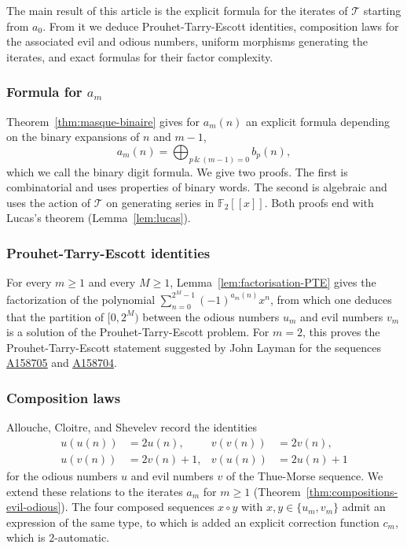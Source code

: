 \documentclass[12pt,reqno]{article}
\newcommand{\seqnum}[1]{\href{https://oeis.org/#1}{\rm \underline{#1}}}
\theoremstyle{plain}
\theoremstyle{definition}
\begin{document}
The main result of this article is the explicit formula for the iterates of
$\mathcal{T}$ starting from $a_0$. From it we deduce Prouhet-Tarry-Escott identities, composition laws for the associated evil and odious numbers, uniform morphisms generating the iterates, and exact formulas for their factor complexity.

\subsubsection*{Formula for $a_m$}

Theorem~\ref{thm:masque-binaire} gives for $a_m(n)$ an explicit formula
depending on the binary expansions of $n$ and $m-1$,
\[
  a_m(n) = \bigoplus_{p\,\&\,(m-1)=0} b_p(n),
\]
which we call the binary digit formula. We give two proofs. The first
is combinatorial and uses properties of binary words. The second is
algebraic and uses the action of $\mathcal{T}$ on generating series
in $\mathbb{F}_2[[x]]$. Both proofs end with Lucas's theorem
(Lemma~\ref{lem:lucas}).

\subsubsection*{Prouhet-Tarry-Escott identities}

For every $m \ge 1$ and every $M \ge 1$,
Lemma~\ref{lem:factorisation-PTE} gives the factorization of the
polynomial $\sum_{n=0}^{2^M-1} (-1)^{a_m(n)} x^n$, from which one
deduces that the partition of $[0, 2^M)$ between the odious numbers
$u_m$ and evil numbers $v_m$ is a solution of the
Prouhet-Tarry-Escott problem. For $m=2$, this proves the Prouhet-Tarry-Escott statement suggested
by John Layman for the sequences \seqnum{A158705} and \seqnum{A158704}.

\subsubsection*{Composition laws}

Allouche, Cloitre, and Shevelev \cite{ACS2016} record the identities
\begin{align*}
  u(u(n)) &= 2u(n), & v(v(n)) &= 2v(n), \\
  u(v(n)) &= 2v(n)+1, & v(u(n)) &= 2u(n)+1
\end{align*}
for the odious numbers $u$ and evil numbers $v$ of the Thue-Morse
sequence. We extend these relations to the iterates $a_m$ for
$m \ge 1$ (Theorem~\ref{thm:compositions-evil-odious}). The four
composed sequences $x \circ y$ with $x, y \in \{u_m, v_m\}$ admit
an expression of the same type, to which is added an explicit
correction function $c_m$, which is $2$-automatic.
\end{document}
